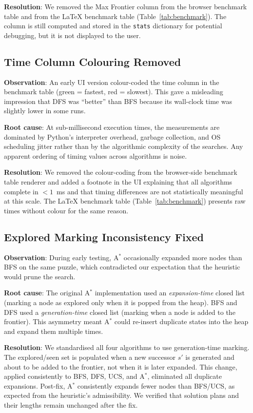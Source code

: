 \documentclass[12pt, a4paper]{report}
\begin{document}
\textbf{Resolution}: We removed the Max Frontier column from the browser
benchmark table and from the LaTeX benchmark table
(Table~\ref{tab:benchmark}).  The column is still computed and stored in the
\texttt{stats} dictionary for potential debugging, but it is not displayed to
the user.

\subsection{Time Column Colouring Removed}

\textbf{Observation}: An early UI version colour-coded the time column in the
benchmark table (green = fastest, red = slowest).  This gave a misleading
impression that DFS was ``better'' than BFS because its wall-clock time was
slightly lower in some runs.

\textbf{Root cause}: At sub-millisecond execution times, the measurements are
dominated by Python's interpreter overhead, garbage collection, and OS
scheduling jitter rather than by the algorithmic complexity of the searches.
Any apparent ordering of timing values across algorithms is noise.

\textbf{Resolution}: We removed the colour-coding from the browser-side
benchmark table renderer and added a footnote in the UI explaining that all
algorithms complete in $<1$~ms and that timing differences are not
statistically meaningful at this scale.  The LaTeX benchmark table
(Table~\ref{tab:benchmark}) presents raw times without colour for the same
reason.

\subsection{Explored Marking Inconsistency Fixed}

\textbf{Observation}: During early testing, A$^{\ast}$ occasionally expanded
more nodes than BFS on the same puzzle, which contradicted our expectation that
the heuristic would prune the search.

\textbf{Root cause}: The original A$^{\ast}$ implementation used an
\emph{expansion-time} closed list (marking a node as explored only when it is
popped from the heap).  BFS and DFS used a \emph{generation-time} closed list
(marking when a node is added to the frontier).  This asymmetry meant
A$^{\ast}$ could re-insert duplicate states into the heap and expand them
multiple times.

\textbf{Resolution}: We standardised all four algorithms to use
generation-time marking.  The explored/seen set is populated when a new
successor $s'$ is generated and about to be added to the frontier, not when it
is later expanded.  This change, applied consistently to BFS, DFS, UCS, and
A$^{\ast}$, eliminated all duplicate expansions.  Post-fix, A$^{\ast}$
consistently expands fewer nodes than BFS/UCS, as expected from the
heuristic's admissibility.  We verified that solution plans and their lengths
remain unchanged after the fix.
\end{document}
